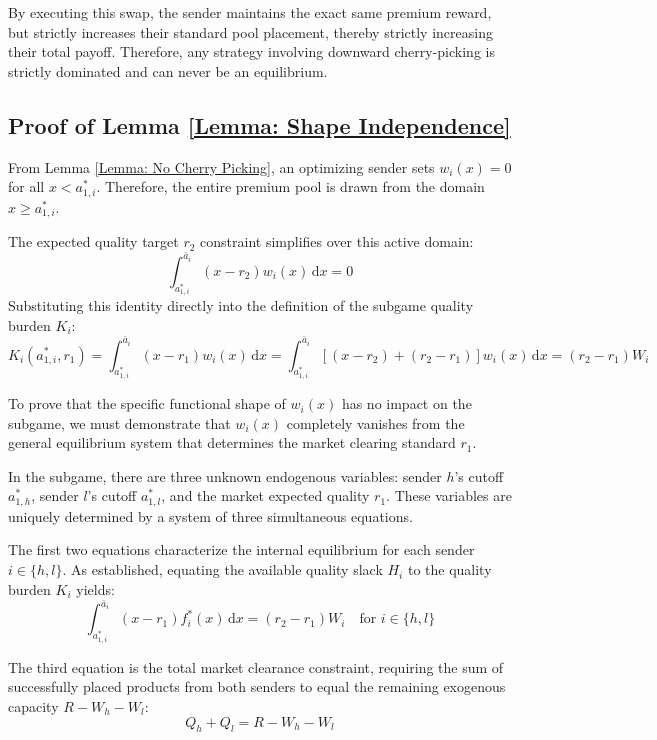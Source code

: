 \documentclass[12pt, a4paper]{article}
\begin{document}
    By executing this swap, the sender maintains the exact same premium reward, but strictly increases their standard pool placement, thereby strictly increasing their total payoff. Therefore, any strategy involving downward cherry-picking is strictly dominated and can never be an equilibrium.


\subsection*{Proof of Lemma \ref{Lemma: Shape Independence}}

From Lemma \ref{Lemma: No Cherry Picking}, an optimizing sender sets $w_i(x) = 0$ for all $x < a_{1,i}^*$. Therefore, the entire premium pool is drawn from the domain $x \ge a_{1,i}^*$.

The expected quality target $r_2$ constraint simplifies over this active domain:
\[
    \int_{a_{1,i}^*}^{\bar{a}_i} (x - r_2) w_i(x) \, \mathrm{d}x = 0
\]
Substituting this identity directly into the definition of the subgame quality burden $K_i$:
\[
    K_i(a_{1,i}^*, r_1) = \int_{a_{1,i}^*}^{\bar{a}_i} (x - r_1) w_i(x) \, \mathrm{d}x = \int_{a_{1,i}^*}^{\bar{a}_i} [(x - r_2) + (r_2 - r_1)] w_i(x) \, \mathrm{d}x = (r_2 - r_1)W_i
\]

To prove that the specific functional shape of $w_i(x)$ has no impact on the subgame, we must demonstrate that $w_i(x)$ completely vanishes from the general equilibrium system that determines the market clearing standard $r_1$. 

In the subgame, there are three unknown endogenous variables: sender $h$'s cutoff $a_{1,h}^*$, sender $l$'s cutoff $a_{1,l}^*$, and the market expected quality $r_1$. These variables are uniquely determined by a system of three simultaneous equations.

The first two equations characterize the internal equilibrium for each sender $i \in \{h, l\}$. As established, equating the available quality slack $H_i$ to the quality burden $K_i$ yields:
\[
    \int_{a_{1,i}^*}^{\bar{a}_i} (x - r_1) f_i^*(x) \, \mathrm{d}x = (r_2 - r_1)W_i \quad \text{for } i \in \{h, l\}
\]

The third equation is the total market clearance constraint, requiring the sum of successfully placed products from both senders to equal the remaining exogenous capacity $R-W_h-W_l$:
\[
    Q_h + Q_l = R-W_h-W_l
\]
\end{document}

